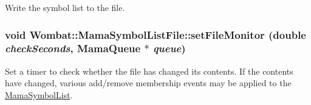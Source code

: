 Write the symbol list to the file. \hypertarget{classWombat_1_1MamaSymbolListFile_aae324ceaa54ff90aa29c67671892f021}{
\subsubsection[{setFileMonitor}]{\setlength{\rightskip}{0pt plus 5cm}void Wombat::MamaSymbolListFile::setFileMonitor (double {\em checkSeconds}, \/  {\bf MamaQueue} $\ast$ {\em queue})}}
\label{classWombat_1_1MamaSymbolListFile_aae324ceaa54ff90aa29c67671892f021}


Set a timer to check whether the file has changed its contents. If the contents have changed, various add/remove membership events may be applied to the \hyperlink{classWombat_1_1MamaSymbolList}{MamaSymbolList}. 